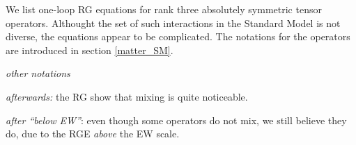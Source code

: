 \documentclass[12pt]{revtex4}
\begin{document}
	
	We list one-loop RG equations for rank three absolutely symmetric
	tensor operators.
	Althought the set of such interactions in the Standard Model is not
	diverse, the equations appear to be complicated.
	The notations for the operators are introduced in section 
	\ref{matter_SM}.
	
	{\it other notations}

	{\it afterwards:} the RG show that mixing is quite noticeable.

	{\it after ``below EW''}: even though some operators do not mix,
	we still believe they do, due to the RGE {\it above} the EW scale.
\end{document}
